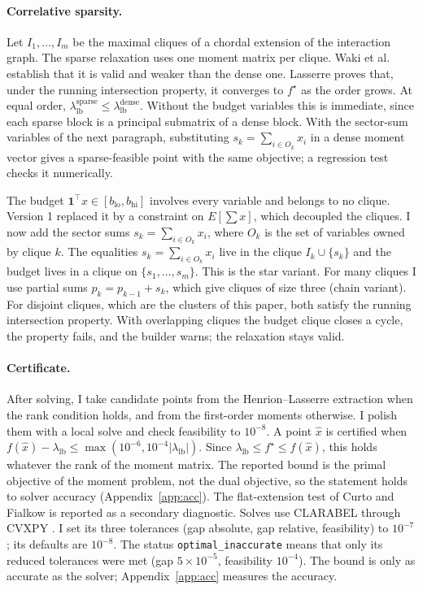 \documentclass[11pt,a4paper]{article}
\newcommand{\lb}{\lambda_{\mathrm{lb}}}
\begin{document}
\paragraph{Correlative sparsity.}
Let $I_1,\dots,I_m$ be the maximal cliques of a chordal extension of the interaction graph.
The sparse relaxation uses one moment matrix per clique.
Waki et al.\ \cite{waki2006} establish that it is valid and weaker than the dense one.
Lasserre \cite{lasserre2006} proves that, under the running intersection property, it converges to $f^\star$ as the order grows.
At equal order, $\lb^{\mathrm{sparse}}\le\lb^{\mathrm{dense}}$.
Without the budget variables this is immediate, since each sparse block is a principal submatrix of a dense block.
With the sector-sum variables of the next paragraph, substituting $s_k=\sum_{i\in O_k}x_i$ in a dense moment vector gives a sparse-feasible point with the same objective; a regression test checks it numerically.

The budget $\mathbf 1^\top x\in[b_{\mathrm{lo}},b_{\mathrm{hi}}]$ involves every variable and belongs to no clique.
Version 1 replaced it by a constraint on $E[\sum x]$, which decoupled the cliques.
I now add the sector sums $s_k=\sum_{i\in O_k}x_i$, where $O_k$ is the set of variables owned by clique $k$.
The equalities $s_k=\sum_{i\in O_k}x_i$ live in the clique $I_k\cup\{s_k\}$ and the budget lives in a clique on $\{s_1,\dots,s_m\}$.
This is the star variant.
For many cliques I use partial sums $p_k=p_{k-1}+s_k$, which give cliques of size three (chain variant).
For disjoint cliques, which are the clusters of this paper, both satisfy the running intersection property.
With overlapping cliques the budget clique closes a cycle, the property fails, and the builder warns; the relaxation stays valid.

\paragraph{Certificate.}
After solving, I take candidate points from the Henrion--Lasserre extraction \cite{henrion2005} when the rank condition holds, and from the first-order moments otherwise.
I polish them with a local solve and check feasibility to $10^{-8}$.
A point $\hat x$ is certified when $f(\hat x)-\lb\le\max(10^{-6},10^{-4}|\lb|)$.
Since $\lb\le f^\star\le f(\hat x)$, this holds whatever the rank of the moment matrix.
The reported bound is the primal objective of the moment problem, not the dual objective, so the statement holds to solver accuracy (Appendix~\ref{app:acc}).
The flat-extension test of Curto and Fialkow \cite{curto2005} is reported as a secondary diagnostic.
Solves use CLARABEL \cite{clarabel2024} through CVXPY \cite{cvxpy2016}.
I set its three tolerances (gap absolute, gap relative, feasibility) to $10^{-7}$; its defaults are $10^{-8}$.
The status \texttt{optimal\_inaccurate} means that only its reduced tolerances were met (gap $5\times10^{-5}$, feasibility $10^{-4}$).
The bound is only as accurate as the solver; Appendix~\ref{app:acc} measures the accuracy.
\end{document}
